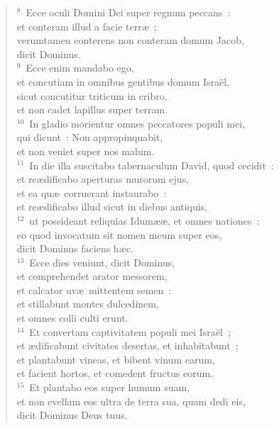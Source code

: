 \begin{verse}${}^{8}$~Ecce oculi Domini Dei super regnum peccans~:\\ et conteram illud a facie terr\ae~;\\ verumtamen conterens non conteram domum Jacob,\\ dicit Dominus.\\
${}^{9}$~Ecce enim mandabo ego,\\ et concutiam in omnibus gentibus domum Isra\"el,\\ sicut concutitur triticum in cribro,\\ et non cadet lapillus super terram.\\
${}^{10}$~In gladio morientur omnes peccatores populi mei,\\ qui dicunt~: Non appropinquabit,\\ et non veniet super nos malum.\\
${}^{11}$~In die illa suscitabo tabernaculum David, quod cecidit~:\\ et re\ae dificabo aperturas murorum ejus,\\ et ea qu\ae\ corruerant instaurabo~:\\ et re\ae dificabo illud sicut in diebus antiquis,\\
${}^{12}$~ut possideant reliquias Idum\ae \ae , et omnes nationes~:\\ eo quod invocatum sit nomen meum super eos,\\ dicit Dominus faciens h\ae c.\\
${}^{13}$~Ecce dies veniunt, dicit Dominus,\\ et comprehendet arator messorem,\\ et calcator uv\ae\ mittentem semen~:\\ et stillabunt montes dulcedinem,\\ et omnes colli culti erunt.\\
${}^{14}$~Et convertam captivitatem populi mei Isra\"el~;\\ et \ae dificabunt civitates desertas, et inhabitabunt~;\\ et plantabunt vineas, et bibent vinum earum,\\ et facient hortos, et comedent fructus eorum.\\
${}^{15}$~Et plantabo eos super humum suam,\\ et non evellam eos ultra de terra sua, quam dedi eis,\\ dicit Dominus Deus tuus.\end{verse}


